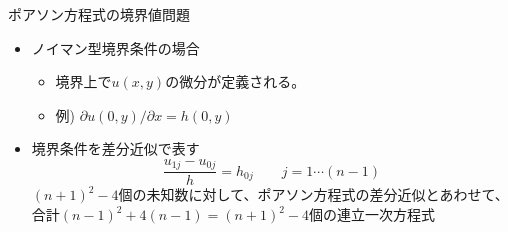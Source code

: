 \begin{frame}[t,fragile]{ポアソン方程式の境界値問題}
  \begin{itemize}
    \setlength{\itemsep}{1em}
  \item ノイマン型境界条件の場合
    \begin{itemize}
    \item 境界上で$u(x,y)$の微分が定義される。
    \item 例) $\partial u(0,y) / \partial x = h(0,y)$
    \end{itemize}
  \item 境界条件を差分近似で表す
    \[
    \frac{u_{1j} - u_{0j}}{h} = h_{0j} \qquad j=1 \cdots (n-1)
    \]
    $(n+1)^2-4$個の未知数に対して、ポアソン方程式の差分近似とあわせて、合計$(n-1)^2+4(n-1)=(n+1)^2-4$個の連立一次方程式
  \end{itemize}
\end{frame}
